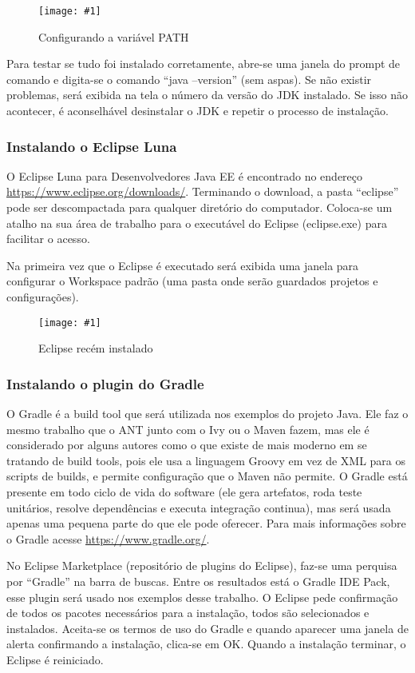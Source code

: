 \documentclass[a4paper,12pt]{article}
\newcommand{\figura}[2] {
	\begin{figure}[ht]
		\centering
		\texttt{[image: \#1]}
		\caption{#2}
	\end{figure}
	\FloatBarrier
}
\begin{document}
\figura{path1.png}{Configurando a variável PATH}

Para testar se tudo foi instalado corretamente, abre-se uma janela do prompt de comando e digita-se o comando “java –version” (sem aspas). Se não existir problemas, será exibida na tela o número da versão do JDK instalado. Se isso não acontecer, é aconselhável desinstalar o JDK e repetir o processo de instalação.

\subsubsection{Instalando o Eclipse Luna} 

O Eclipse Luna para Desenvolvedores Java EE é encontrado no endereço \url{https://www.eclipse.org/downloads/}. Terminando o download, a pasta “eclipse” pode ser descompactada para qualquer diretório do computador. Coloca-se um atalho na sua área de trabalho para o executável do Eclipse (eclipse.exe) para facilitar o acesso.

Na primeira vez que o Eclipse é executado será exibida uma janela para configurar o Workspace padrão (uma pasta onde serão guardados projetos e configurações).

\figura{eclipse1.png}{Eclipse recém instalado}

\subsubsection{Instalando o plugin do Gradle} 

O Gradle é a build tool que será utilizada nos exemplos do projeto Java. Ele faz o mesmo trabalho que o ANT junto com o Ivy ou o Maven fazem, mas ele é considerado por alguns autores como o que existe de mais moderno em se tratando de build tools, pois ele usa a linguagem Groovy em vez de XML para os scripts de builds, e permite configuração que o Maven não permite. O Gradle está presente em todo ciclo de vida do software (ele gera artefatos, roda teste unitários, resolve dependências e executa integração continua), mas será usada apenas uma pequena parte do que ele pode oferecer. Para mais informações sobre o Gradle acesse \url{https://www.gradle.org/}.

No Eclipse Marketplace (repositório de plugins do Eclipse), faz-se uma perquisa por “Gradle” na barra de buscas. Entre os resultados está o Gradle IDE Pack, esse plugin será usado nos exemplos desse trabalho. O Eclipse pede confirmação de todos os pacotes necessários para a instalação, todos são selecionados e instalados. Aceita-se os termos de uso do Gradle e quando aparecer uma janela de alerta confirmando a instalação, clica-se em OK. Quando a instalação terminar, o Eclipse é reiniciado.
\end{document}

